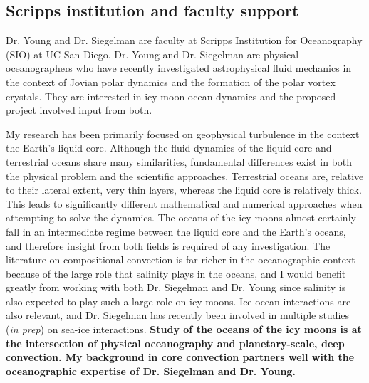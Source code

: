 \documentclass[12pt]{article}
\title{}
\author{}
\date{}
\begin{document}
\pagestyle{fancy}
\thispagestyle{fancy}
\setlength{\headheight}{25pt}
\fancyhf{} %
\fancyhead[L]{\textcolor{red}{Tobias Oliver\\
		Rationale for University of California San Diego\\
Proposed Mentor: Professor Lia Siegelman}}
\fancyfoot[R]{\thepage}
\subsection*{Scripps institution and faculty support}
Dr. Young and Dr. Siegelman are faculty at Scripps Institution for Oceanography (SIO) at UC San Diego. Dr. Young and Dr. Siegelman are physical oceanographers who have recently investigated astrophysical fluid mechanics in the context of Jovian polar dynamics and the formation of the polar vortex crystals\cite{lS22,lS22b,lS24}. They are interested in icy moon ocean dynamics and the proposed project involved input from both.

My research has been primarily focused on geophysical turbulence in the context the Earth's liquid core. Although the fluid dynamics of the liquid core and terrestrial oceans share many similarities, fundamental differences exist in both the physical problem and the scientific approaches. Terrestrial oceans are, relative to their lateral extent, very thin layers, whereas the liquid core is relatively thick. This leads to significantly different mathematical and numerical approaches when attempting to solve the dynamics.
The oceans of the icy moons almost certainly fall in an intermediate regime between the liquid core and the Earth's oceans, and therefore insight from both fields is required of any investigation. The literature on compositional convection is far richer in the oceanographic context because of the large role that salinity plays in the oceans, and I would benefit greatly from working with both Dr. Siegelman and Dr. Young since salinity is also expected to play such a large role on icy moons. 
Ice-ocean interactions are also relevant, and Dr. Siegelman has recently been involved in multiple studies (\textit{in prep}) on sea-ice interactions. 
\textbf{Study of the oceans of the icy moons is at the intersection of physical oceanography and planetary-scale, deep convection. My background in core convection partners well with the oceanographic expertise of Dr. Siegelman and Dr. Young.}
\end{document}
